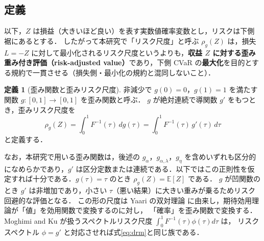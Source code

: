 \documentclass[a4paper,10pt]{jsarticle}
\theoremstyle{definition}
\newtheorem{definition}{定義}[section]
\newcommand{\Finv}{F^{-1}}
\newcommand{\E}{\mathbb{E}}
\begin{document}
\subsection{定義}
以下，$Z$ は損益（大きいほど良い）を表す実数値確率変数とし，リスクは下側裾にあるとする．
したがって本研究で「リスク尺度」と呼ぶ $\rho_g(Z)$ は，損失 $L=-Z$ に対して最小化されるリスク尺度というよりも，\textbf{収益 $Z$ に対する歪み重み付き評価（risk-adjusted value）}であり，下側 CVaR の\textbf{最大化}を目的とする規約で一貫させる（損失側・最小化の規約と混同しないこと）．
\begin{definition}[歪み関数と歪みリスク尺度]
非減少で $g(0)=0$，$g(1)=1$ を満たす関数 $g:[0,1]\to[0,1]$ を歪み関数と呼ぶ．
$g$ が絶対連続で導関数 $g'$ をもつとき，歪みリスク尺度を
\begin{equation}
  \rho_g(Z)=\int_0^1\Finv(\tau)\,dg(\tau)=\int_0^1\Finv(\tau)\,g'(\tau)\,d\tau
  \label{eq:drm}
\end{equation}
と定義する．
\end{definition}
なお，本研究で用いる歪み関数は，後述の $g_\alpha$，$g_{\alpha,\lambda}$，$g_\eta$ を含めいずれも区分的になめらかであり，$g'$ は区分定数または連続である．以下ではこの正則性を仮定すれば十分である．$g(\tau)=\tau$ のとき $\rho_g(Z)=\E[Z]$ である．
$g$ が凹関数のとき $g'$ は非増加であり，小さい $\tau$（悪い結果）に大きい重みが乗るためリスク回避的な評価となる．
この形の尺度は Yaari の双対理論 \cite{yaari1987dual} に由来し，期待効用理論が「値」を効用関数で変換するのに対し，
「確率」を歪み関数で変換する．
Moghimi and Ku \cite{moghimi2025beyond} が扱うスペクトルリスク尺度 $\int_0^1\Finv(\tau)\phi(\tau)d\tau$ は，
リスクスペクトル $\phi=g'$ と対応させれば式\eqref{eq:drm}と同じ族である．
\end{document}
